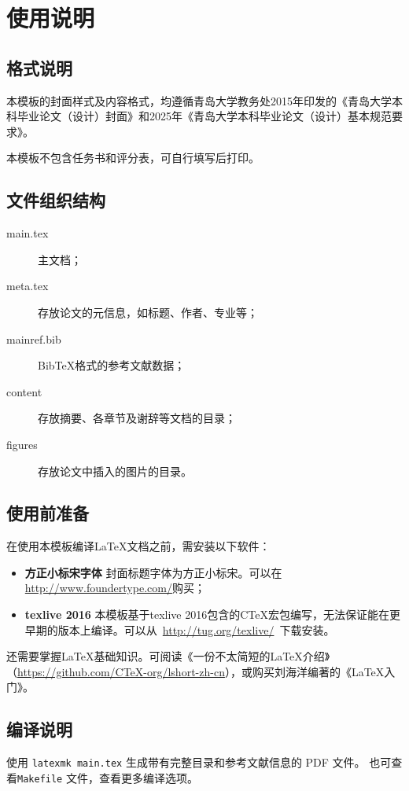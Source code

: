 \chapter{使用说明}
\section{格式说明}
本模板的封面样式及内容格式，均遵循青岛大学教务处2015年印发的《青岛大学本科毕业论文（设计）封面》和2025年《青岛大学本科毕业论文（设计）基本规范要求》。

本模板不包含任务书和评分表，可自行填写后打印。

\section{文件组织结构}
\begin{description}
\item[main.tex] 主文档；
\item[meta.tex] 存放论文的元信息，如标题、作者、专业等；
\item[mainref.bib] BibTeX格式的参考文献数据；
\item[content] 存放摘要、各章节及谢辞等文档的目录；
\item[figures] 存放论文中插入的图片的目录。
\end{description}
\section{使用前准备}
在使用本模板编译\LaTeX 文档之前，需安装以下软件：
\begin{itemize}
\item{\bf 方正小标宋字体} 封面标题字体为方正小标宋。可以在\url{http://www.foundertype.com/}购买；
\item{\bf texlive 2016} 本模板基于texlive 2016包含的CTeX宏包编写，无法保证能在更早期的版本上编译。可以从~\url{http://tug.org/texlive/}~下载安装。
\end{itemize}

还需要掌握\LaTeX 基础知识。可阅读《一份不太简短的\LaTeX 介绍》（\url{https://github.com/CTeX-org/lshort-zh-cn}），或购买刘海洋编著的《\LaTeX 入门》。

\section{编译说明}
使用 \texttt{latexmk main.tex} 生成带有完整目录和参考文献信息的 PDF 文件。
也可查看\texttt{Makefile} 文件，查看更多编译选项。

